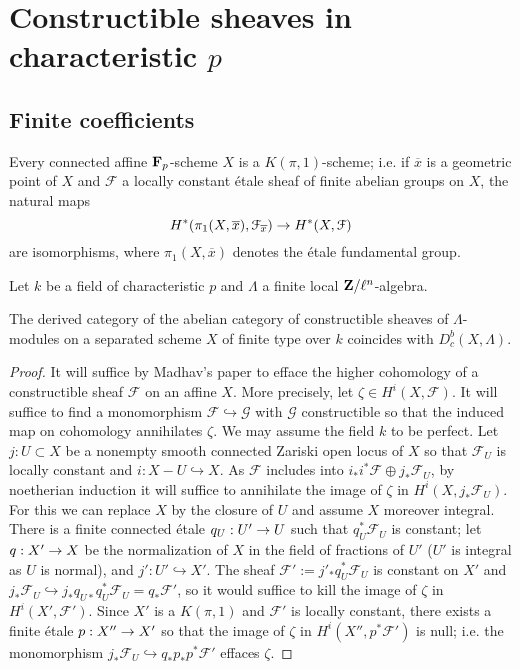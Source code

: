 \documentclass[deligne.tex]{subfiles}
\begin{document}
\section{Constructible sheaves in characteristic $p$}
\subsection{Finite coefficients}
\begin{theorem*}[Achinger]
	Every connected affine $\mathbf{F}_p$-scheme $X$ is a $K(\pi,1)$-scheme; i.e.
	if $\overline x$ is a geometric point of $X$ and $\mathcal F$ a locally
	constant étale sheaf of finite abelian groups on $X$, the natural maps
	\begin{equation*}
	H^*(\pi_1(X,\overline x),\mathcal F_{\overline x})\rightarrow H^*(X,\mathcal F)
	\end{equation*}
	are isomorphisms, where $\pi_1(X,\overline x)$ denotes the étale 
	fundamental group.
\end{theorem*}
Let $k$ be a field of characteristic $p$ and $\Lambda$ a finite local
$\mathbf{Z}/\ell^n$-algebra.
\begin{corollary*}
	The derived category of the abelian category of constructible sheaves of
	$\Lambda$-modules on a separated scheme $X$ of finite type over $k$
	coincides with $D_c^b(X,\Lambda)$.
\end{corollary*}
\begin{proof}
	It will suffice by Madhav's paper to efface the higher cohomology of a 
constructible sheaf $\mathcal F$ on an affine $X$.
More precisely, let $\zeta\in H^i(X,\mathcal F)$.
It will suffice to find a monomorphism $\mathcal F\hookrightarrow\mathcal G$
with $\mathcal G$ constructible so that the induced map on cohomology
annihilates $\zeta$. We may assume the field $k$ to be perfect.
Let $j:U\subset X$ be a nonempty smooth connected Zariski open locus
of $X$ so that $\mathcal F_U$ is locally constant and
$i:X-U\hookrightarrow X$.
As $\mathcal F$ includes into $i_*i^*\mathcal F\oplus j_*\mathcal F_U$, by
noetherian induction it will suffice to annihilate the image of $\zeta$ in
$H^i(X,j_*\mathcal F_U)$. For this we can replace $X$ by the closure of $U$
and assume $X$ moreover integral.
There is a finite connected étale $q_U:U'\rightarrow U$ such that
$q_U^*\mathcal F_U$ is constant; let $q:X'\rightarrow X$ be the normalization of $X$
in the field of fractions of $U'$ ($U'$ is integral as $U$ is normal),
and $j':U'\hookrightarrow X'$.
The sheaf $\mathcal F':=j'_*q_U^*\mathcal F_U$ is constant on $X'$ and
$j_*\mathcal F_U\hookrightarrow j_*q_{U*}q_U^*\mathcal F_U=q_*\mathcal F'$,
so it would  suffice to kill the image of $\zeta$ in $H^i(X',\mathcal F')$.
Since $X'$ is a $K(\pi,1)$ and $\mathcal F'$ is locally constant,
there exists a finite étale $p:X''\rightarrow X'$ so that the image of 
$\zeta$ in $H^i(X'',p^*\mathcal F')$ is null; i.e. the monomorphism
$j_*\mathcal F_U\hookrightarrow q_*p_*p^*\mathcal F'$ effaces $\zeta$.
\end{proof}
\end{document}
